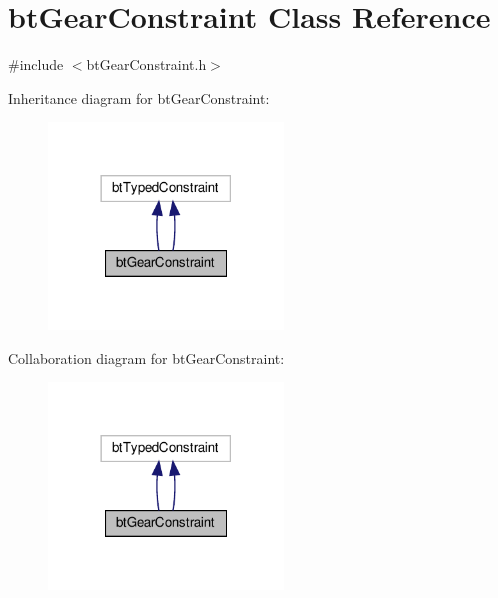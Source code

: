 \hypertarget{classbtGearConstraint}{}\section{bt\+Gear\+Constraint Class Reference}
\label{classbtGearConstraint}


{\ttfamily \#include $<$bt\+Gear\+Constraint.\+h$>$}



Inheritance diagram for bt\+Gear\+Constraint\+:
\nopagebreak
\begin{figure}[H]
\begin{center}
\leavevmode
\includegraphics[width=177pt]{classbtGearConstraint__inherit__graph}
\end{center}
\end{figure}


Collaboration diagram for bt\+Gear\+Constraint\+:
\nopagebreak
\begin{figure}[H]
\begin{center}
\leavevmode
\includegraphics[width=177pt]{classbtGearConstraint__coll__graph}
\end{center}
\end{figure}
